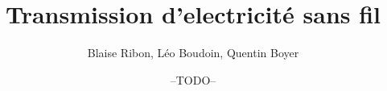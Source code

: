﻿\documentclass[11pt,a4paper]{report}
\begin{document}
\title{Transmission d'electricité sans fil}
\author{Blaise Ribon, Léo Boudoin, Quentin Boyer}
\date{--TODO--}
\maketitle
\end{document}

